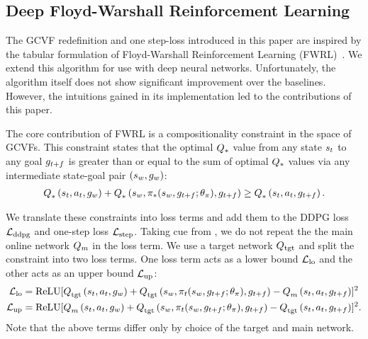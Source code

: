 \subsection{Deep Floyd-Warshall Reinforcement Learning}

The GCVF redefinition and one step-loss introduced in this paper are inspired by
the tabular formulation of Floyd-Warshall
Reinforcement Learning (FWRL)~\citep{kaelbling1993learning}.
We extend this algorithm for use with deep neural networks.
Unfortunately, the algorithm itself does not show significant improvement over
the baselines. However, the intuitions gained in its implementation led to
the contributions of this paper. 

The core contribution of FWRL is a compositionality constraint in the space
of GCVFs. 
This constraint states that the optimal $\Q_*$ value 
from any state $\state_t$ to any goal $\goal_{t+f}$ is greater than or equal to
the sum of optimal $\Q_*$ values via any intermediate state-goal pair $(\state_{w}, \goal_{w})$:
%
\begin{align}
      \fwargs{\state_{t}}{\act_t}{\goal_{w}}{*}{}
      + \fwargs{\state_{w}}{\policy_*(\state_{w}, \goal_{t+f};\param_\policy)}{\goal_{t+f}}{*}{}
      \ge \fwargs{\state_{t}}{\act_t}{\goal_{t+f}}{*}{}.
\end{align}%
% 

We translate these constraints into loss terms and add them to the
DDPG loss $\LossDDPG$ and one-step loss $\LossStep$.
Taking cue from \citet{mnih2015human}, we do
not repeat the the main online network $\Q_{m}$ in the loss term. We use
a target network $\Qtgt$ and split the constraint into two loss terms. One loss term acts
as a lower bound $\LossLo$ and the other acts as an upper bound $\LossUp$:
%
\begin{align}
  \LossLo &= \text{ReLU}[
      \fwargs{\state_{t}}{\act_t}{\goal_{w}}{\tgt}{}
      + \fwargs{\state_{w}}{\policy_t(\state_{w}, \goal_{t+f};\param_\policy)}{\goal_{t+f}}{\tgt}{}
      - \fwargs{\state_{t}}{\act_t}{\goal_{t+f}}{m}{}
      ]^2
                         \\
  \LossUp &= \text{ReLU}[
      \fwargs{\state_{t}}{\act_t}{\goal_{w}}{m}{}
      + \fwargs{\state_{w}}{\policy_t(\state_{w}, \goal_{t+f};\param_\policy)}{\goal_{t+f}}{\tgt}{}
      - \fwargs{\state_{t}}{\act_t}{\goal_{t+f}}{\tgt}{}
      ]^2.
\end{align}%
% 
Note that the above terms differ only by choice of the target and main network. 


